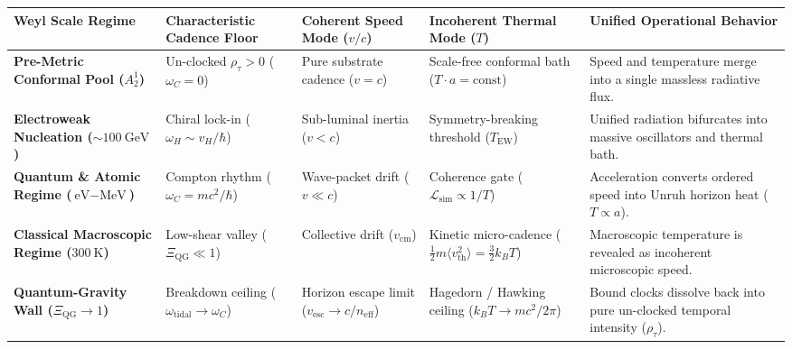 \documentclass[
]{article}
\newcounter{none} %
\begin{document}
{\def\LTcaptype{none} %
\begin{longtable}[]{@{}
  >{\raggedright\arraybackslash}p{}
  >{\raggedright\arraybackslash}p{}
  >{\raggedright\arraybackslash}p{}
  >{\raggedright\arraybackslash}p{}
  >{\raggedright\arraybackslash}p{}@{}}
\toprule\noalign{}
\begin{minipage}[b]{\linewidth}\raggedright
Weyl Scale Regime
\end{minipage} & \begin{minipage}[b]{\linewidth}\raggedright
Characteristic Cadence Floor
\end{minipage} & \begin{minipage}[b]{\linewidth}\raggedright
Coherent Speed Mode (\(v/c\))
\end{minipage} & \begin{minipage}[b]{\linewidth}\raggedright
Incoherent Thermal Mode (\(T\))
\end{minipage} & \begin{minipage}[b]{\linewidth}\raggedright
Unified Operational Behavior
\end{minipage} \\
\midrule\noalign{}
\endhead
\bottomrule\noalign{}
\endlastfoot
\textbf{Pre-Metric Conformal Pool (\(A_2^1\))} & Un-clocked
\(\rho_\tau > 0\) (\(\omega_C = 0\)) & Pure substrate cadence
(\(v = c\)) & Scale-free conformal bath (\(T \cdot a = \text{const}\)) &
Speed and temperature merge into a single massless radiative flux. \\
\textbf{Electroweak Nucleation (\(\sim 100\ \text{GeV}\))} & Chiral
lock-in (\(\omega_H \sim v_H/\hbar\)) & Sub-luminal inertia (\(v < c\))
& Symmetry-breaking threshold (\(T_{\mathrm{EW}}\)) & Unified radiation
bifurcates into massive oscillators and thermal bath. \\
\textbf{Quantum \& Atomic Regime (\(\text{eV} - \text{MeV}\))} & Compton
rhythm (\(\omega_C = mc^2/\hbar\)) & Wave-packet drift (\(v \ll c\)) &
Coherence gate (\(\mathcal{L}_{\mathrm{sim}} \propto 1/T\)) &
Acceleration converts ordered speed into Unruh horizon heat
(\(T \propto a\)). \\
\textbf{Classical Macroscopic Regime (\(300\ \text{K}\))} & Low-shear
valley (\(\Xi_{\mathrm{QG}} \ll 1\)) & Collective drift
(\(v_{\mathrm{cm}}\)) & Kinetic micro-cadence
(\(\frac{1}{2}m\langle v_{\mathrm{th}}^2\rangle = \frac{3}{2}k_B T\)) &
Macroscopic temperature is revealed as incoherent microscopic speed. \\
\textbf{Quantum-Gravity Wall (\(\Xi_{\mathrm{QG}} \to 1\))} & Breakdown
ceiling (\(\omega_{\mathrm{tidal}} \to \omega_C\)) & Horizon escape
limit (\(v_{\mathrm{esc}} \to c/n_{\mathrm{eff}}\)) & Hagedorn / Hawking
ceiling (\(k_B T \to mc^2/2\pi\)) & Bound clocks dissolve back into pure
un-clocked temporal intensity (\(\rho_\tau\)). \\
\end{longtable}
}
\end{document}
